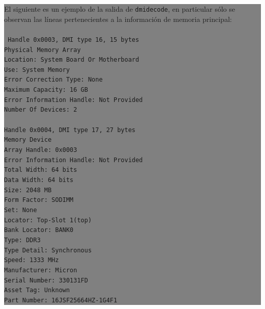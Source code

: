 \documentclass[12pt]{article}
\begin{document}
\colorbox{grey}{\parbox[t]{0.95\linewidth}{ \vspace*{0.5cm} { 
El siguiente es un ejemplo de la salida de \texttt{dmidecode}, en 
particular sólo se observan las líneas pertenecientes a la 
información de memoria principal: \\ 
\\ 
{\tt \small
Handle 0x0003, DMI type 16, 15 bytes\\
Physical Memory Array\\
	Location: System Board Or Motherboard\\
	Use: System Memory\\
	Error Correction Type: None\\
	Maximum Capacity: 16 GB\\
	Error Information Handle: Not Provided\\
	Number Of Devices: 2\\
\\
Handle 0x0004, DMI type 17, 27 bytes\\
Memory Device\\
	Array Handle: 0x0003\\
	Error Information Handle: Not Provided\\
	Total Width: 64 bits\\
	Data Width: 64 bits\\
	Size: 2048 MB\\
	Form Factor: SODIMM\\
	Set: None\\
	Locator: Top-Slot 1(top)\\
	Bank Locator: BANK0\\
	Type: DDR3\\
	Type Detail: Synchronous\\
	Speed: 1333 MHz\\
	Manufacturer: Micron\\
	Serial Number: 330131FD\\
	Asset Tag: Unknown\\
	Part Number: 16JSF25664HZ-1G4F1\\
}
} \vspace*{0.5cm} } } 
\end{document}
